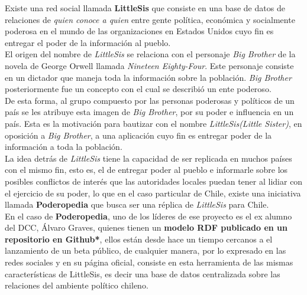 
\begin{intro}
  Existe una red social llamada \textbf{LittleSis}\cite{littlesis} que consiste en una base de datos de relaciones de \emph{quien conoce a quien} entre gente política, económica y socialmente poderosa en el mundo de las organizaciones en Estados Unidos cuyo fin es entregar el poder de la información al pueblo.\\

  El origen del nombre de \emph{LittleSis} se relaciona con el personaje \emph{Big Brother} de la novela de George Orwell llamada \emph{Nineteen Eighty-Four}. Este personaje consiste en un dictador que maneja toda la información sobre la población. \emph{Big Brother} posteriormente fue un concepto con el cual se describió un ente poderoso.\\
 
  De esta forma, al grupo compuesto por las personas poderosas y políticos de un país se les atribuye esta imagen de \emph{Big Brother}, por su poder e influencia en un país. Esta es la motivación para bautizar con el nombre \emph{LittleSis}\emph{(Little Sister)}, en oposición a \emph{Big Brother}, a una aplicación cuyo fin es entregar poder de  la información a toda la población.\\

  La idea detrás de \emph{LittleSis} tiene la capacidad de ser replicada en muchos países con el mismo fin, esto es, el de entregar poder al pueblo e informarle sobre los posibles conflictos de interés que las autoridades locales puedan tener al lidiar con el ejercicio de su poder, lo que en el caso particular de Chile, existe una iniciativa llamada \textbf{Poderopedia}\cite{poderopedia} que busca ser una réplica de \emph{LittleSis} para Chile.\\

  En el caso de \textbf{Poderopedia}, uno de los líderes de ese proyecto es el ex alumno del DCC, Álvaro Graves, quienes tienen un \textbf{modelo RDF publicado en un repositorio en Github*}, ellos están desde hace un tiempo cercanos a el lanzamiento de un beta público, de cualquier manera, por lo expresado en las redes sociales y en su página oficial, consiste en esta herramienta de las mismas características de LittleSis, es decir una base de datos centralizada sobre las relaciones del ambiente político chileno.


\end{intro}
